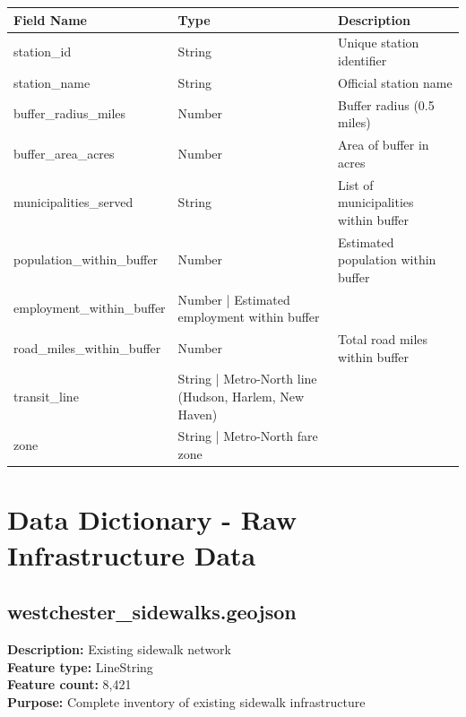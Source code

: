 \documentclass[11pt,letterpaper]{article}
\begin{document}
\begin{table}[h]
\centering
\caption{Attribute Dictionary - metro\_north\_station\_buffers.geojson}
\begin{longtable}{lll}
\toprule
\textbf{Field Name} & \textbf{Type} & \textbf{Description} \\
\midrule
station\_id & String & Unique station identifier \\
station\_name & String & Official station name \\
buffer\_radius\_miles & Number & Buffer radius (0.5 miles) \\
buffer\_area\_acres & Number & Area of buffer in acres \\
municipalities\_served & String & List of municipalities within buffer \\
population\_within\_buffer & Number & Estimated population within buffer \\
employment\_within\_buffer & Number | Estimated employment within buffer \\
road\_miles\_within\_buffer & Number & Total road miles within buffer \\
transit\_line & String | Metro-North line (Hudson, Harlem, New Haven) \\
zone & String | Metro-North fare zone \\
\bottomrule
\end{longtable}
\end{table}

\section{Data Dictionary - Raw Infrastructure Data}

\subsection{westchester\_sidewalks.geojson}

\textbf{Description:} Existing sidewalk network\\
\textbf{Feature type:} LineString\\
\textbf{Feature count:} 8,421\\
\textbf{Purpose:} Complete inventory of existing sidewalk infrastructure
\end{document}
